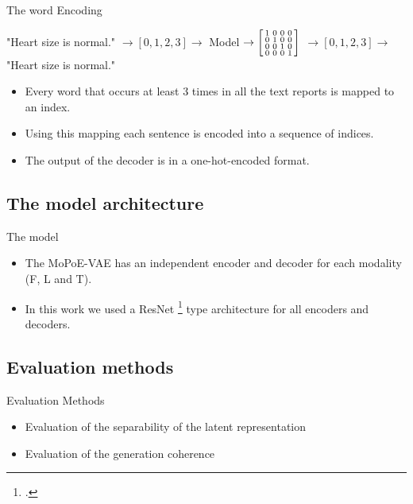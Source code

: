     \begin{frame}{The word Encoding}

        \small{
            "Heart size is normal." $\rightarrow [0,1,2,3] \rightarrow$ Model $\rightarrow
            \begin{bsmallmatrix}
                1 & 0 & 0 & 0\\
                0 & 1 & 0 & 0\\
                0 & 0 & 1 & 0\\
                0 & 0 & 0 & 1\\
            \end{bsmallmatrix}$
            $\rightarrow [0,1,2,3] \rightarrow$ "Heart size is normal."}\\
        \vspace{\baselineskip}
        \pause
        \begin{itemize}
            \item Every word that occurs at least 3 times in all the text reports is mapped to an index.
            \pause
            \item Using this mapping each sentence is encoded into a sequence of indices.
            \pause
            \item The output of the decoder is in a one-hot-encoded format.
        \end{itemize}
    \end{frame}

    \subsection{The model architecture}
    \begin{frame}{The model}
        \begin{itemize}
            \item The MoPoE-VAE has an independent encoder and decoder for each modality (F, L and T).
            \item In this work we used a ResNet \footcite{he2016deep} type architecture for all encoders and decoders.
        \end{itemize}

    \end{frame}

    \subsection{Evaluation methods}

    \begin{frame}{Evaluation Methods}
        \begin{itemize}
            \item Evaluation of the separability of the latent representation
            \item Evaluation of the generation coherence
        \end{itemize}
    \end{frame}

